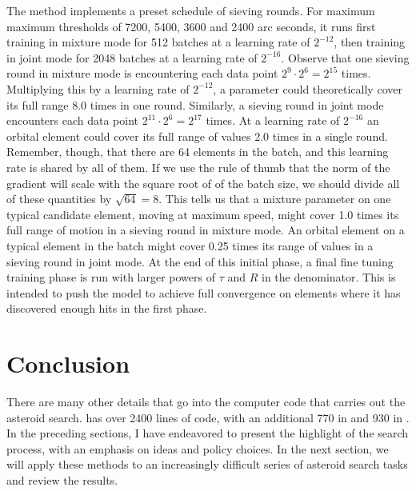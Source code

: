 The method  implements a preset schedule of sieving rounds.
For maximum maximum thresholds of 7200, 5400, 3600 and 2400 arc seconds, 
it runs first training in mixture mode for 512 batches at a learning rate of $2^{-12}$, 
then training in joint mode for 2048 batches at a learning rate of $2^{-16}$.
Observe that one sieving round in mixture mode is encountering each data point $2^{9} \cdot 2^{6} = 2^{15}$ times.
Multiplying this by a learning rate of $2^{-12}$, a parameter could theoretically cover its full range 8.0 times in one round.
Similarly, a sieving round in joint mode encounters each data point $2^{11} \cdot 2^{6} = 2^{17}$ times.
At a learning rate of $2^{-16}$ an orbital element could cover its full range of values 2.0 times in a single round.
Remember, though, that there are 64 elements in the batch, and this learning rate is shared by all of them.
If we use the rule of thumb that the norm of the gradient will scale with the square root of of the batch size,
we should divide all of these quantities by $\sqrt{64} = 8$.
This tells us that a mixture parameter on one typical candidate element, moving at maximum speed,
might cover 1.0 times its full range of motion in a sieving round in mixture mode.
An orbital element on a typical element in the batch might cover 0.25 times its range of values
in a sieving round in joint mode.
At the end of this initial phase, a final fine tuning training phase is run with larger powers of $\tau$ and $R$ in the denominator.
This is intended to push the model to achieve full convergence on elements where it has discovered enough hits in the first phase.

\section{Conclusion}
There are many other details that go into the computer code that carries out the asteroid search.
 has over 2400 lines of code, with an additional 770 in  and 930 in .
In the preceding sections, I have endeavored to present the highlight of the search process, with an emphasis on ideas and policy choices.
In the next section, we will apply these methods to an increasingly difficult series of asteroid search tasks and review the results.